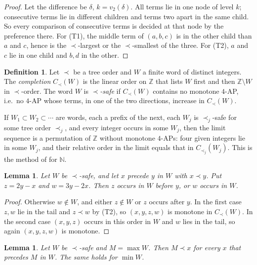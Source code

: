 \documentclass[11pt]{amsart}
\newtheorem{lemma}[theorem]{Lemma}
\theoremstyle{definition}
\newtheorem{definition}[theorem]{Definition}
\theoremstyle{remark}
\newcommand{\Z}{\mathbb{Z}}
\newcommand{\N}{\mathbb{N}}
\begin{document}
\begin{proof}
Let the difference be $\delta$, $k=v_2(\delta)$. All terms lie in one node of level $k$; consecutive terms lie in different children and terms two apart in the same child. So every comparison of consecutive terms is decided at that node by the preference there. For (T1), the middle term of $(a,b,c)$ is in the other child than $a$ and $c$, hence is the $\prec$-largest or the $\prec$-smallest of the three. For (T2), $a$ and $c$ lie in one child and $b,d$ in the other.
\end{proof}

\begin{definition}
Let $\prec$ be a tree order and $W$ a finite word of distinct integers. The \emph{completion} $C_\prec(W)$ is the linear order on $\Z$ that lists $W$ first and then $\Z\setminus W$ in $\prec$-order. The word $W$ is \emph{$\prec$-safe} if $C_\prec(W)$ contains no monotone $4$-AP, i.e.\ no $4$-AP whose terms, in one of the two directions, increase in $C_\prec(W)$.
\end{definition}

If $W_1\subset W_2\subset\cdots$ are words, each a prefix of the next, each $W_j$ is $\prec_j$-safe for some tree order $\prec_j$, and every integer occurs in some $W_j$, then the limit sequence is a permutation of $\Z$ without monotone $4$-APs: four given integers lie in some $W_j$, and their relative order in the limit equals that in $C_{\prec_j}(W_j)$. This is the method of \cite{Ho26} for $\N$.

\begin{lemma}\label{lem:escape}
Let $W$ be $\prec$-safe, and let $x$ precede $y$ in $W$ with $x\prec y$. Put $z=2y-x$ and $w=3y-2x$. Then $z$ occurs in $W$ before $y$, or $w$ occurs in $W$.
\end{lemma}

\begin{proof}
Otherwise $w\notin W$, and either $z\notin W$ or $z$ occurs after $y$. In the first case $z,w$ lie in the tail and $z\prec w$ by (T2), so $(x,y,z,w)$ is monotone in $C_\prec(W)$. In the second case $(x,y,z)$ occurs in this order in $W$ and $w$ lies in the tail, so again $(x,y,z,w)$ is monotone.
\end{proof}

\begin{lemma}\label{lem:extreme}
Let $W$ be $\prec$-safe and $M=\max W$. Then $M\prec x$ for every $x$ that precedes $M$ in $W$. The same holds for $\min W$.
\end{lemma}
\end{document}
